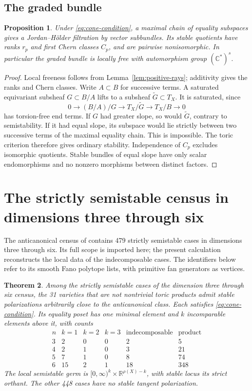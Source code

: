 \documentclass[11pt]{amsart}
\newtheorem{theorem}{Theorem}[section]
\newtheorem{proposition}[theorem]{Proposition}
\theoremstyle{definition}
\theoremstyle{remark}
\newcommand{\RR}{\mathbb R}
\newcommand{\CC}{\mathbb C}
\begin{document}
\subsection{The graded bundle}
\begin{proposition}\label{prop:graded}
Under \eqref{eq:cone-condition}, a maximal chain of equality subspaces
gives a Jordan--H\"older filtration by vector subbundles. Its stable
quotients have ranks $r_p$ and first Chern classes $C_p$, and are
pairwise nonisomorphic. In particular the graded bundle is locally
free with automorphism group $(\CC^*)^s$.
\end{proposition}
\begin{proof}
Local freeness follows from Lemma~\ref{lem:positive-rays}; additivity
gives the ranks and Chern classes. Write $A\subset B$ for successive
terms. A saturated equivariant subsheaf $G\subset B/A$ lifts to a
subsheaf $\widetilde G\subset T_X$. It is saturated, since
\[
 0\longrightarrow(B/A)/G\longrightarrow T_X/\widetilde G
 \longrightarrow T_X/B\longrightarrow0
\]
has torsion-free end terms. If $G$ had greater slope, so would
$\widetilde G$, contrary to semistability. If it had equal slope,
its subspace would lie strictly between two successive terms of the
maximal equality chain. This is impossible. The toric criterion
therefore gives ordinary stability. Independence of $C_p$ excludes
isomorphic quotients. Stable bundles of equal slope have only scalar
endomorphisms and no nonzero morphisms between distinct factors.
\end{proof}

\section{The strictly semistable census in dimensions three through six}
\label{sec:census}

The anticanonical census of \cite{Wuebben} contains 479 strictly
semistable cases in dimensions three through six. Its full scope is
imported here; the present calculation reconstructs the local data of
the indecomposable cases. The identifiers below refer to its smooth
Fano polytope lists, with primitive fan generators as vertices.

\begin{theorem}\label{thm:census}
Among the strictly semistable cases of the dimension three through six
census, the 31 varieties that are not nontrivial toric products admit
stable polarizations arbitrarily close to the anticanonical class.
Each satisfies \eqref{eq:cone-condition}. Its equality poset has one
minimal element and $k$ incomparable elements above it, with counts
\[
\begin{array}{c|rrr|rr}
 n&k=1&k=2&k=3&\text{indecomposable}&\text{product}\\ \hline
 3&2&0&0&2&5\\
 4&2&1&0&3&21\\
 5&7&1&0&8&74\\
 6&15&2&1&18&348
\end{array}
\]
The local semistable germ is
$[0,\infty)^k\times\RR^{\rho(X)-k}$, with stable locus its strict
orthant. The other 448 cases have no stable tangent polarization.
\end{theorem}
\end{document}
